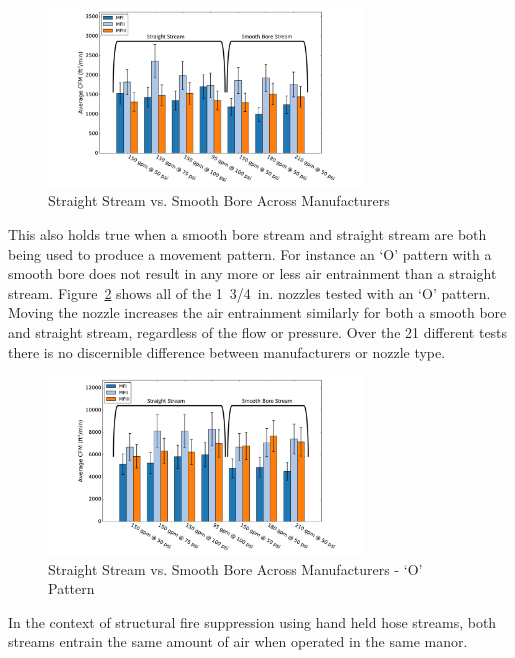 \documentclass[12pt,oneside]{book}
\begin{document}
\begin{figure}[H]
\centering
\includegraphics[width=0.75\textwidth]{Figures/Air_Entrainment/SB_SS_All_Manufacture.pdf}
\caption{Straight Stream vs. Smooth Bore Across Manufacturers}
\label{fig:SS_vs_SB}
\end{figure}

This also holds true when a smooth bore stream and straight stream are both being used to produce a movement pattern. For instance an `O' pattern with a smooth bore does not result in any more or less air entrainment than a straight stream. Figure~\ref{fig:SS_vs_SB_O} shows all of the 1~3/4~in. nozzles tested with an `O' pattern. Moving the nozzle increases the air entrainment similarly for both a smooth bore and straight stream, regardless of the flow or pressure. Over the 21 different tests there is no discernible difference between manufacturers or nozzle type. 

\begin{figure}[H]
\centering
\includegraphics[width=0.75\textwidth]{Figures/Air_Entrainment/SB_SS_All_O_Manufacture.pdf}
\caption{Straight Stream vs. Smooth Bore Across Manufacturers - `O' Pattern}
\label{fig:SS_vs_SB_O}
\end{figure}

In the context of structural fire suppression using hand held hose streams, both streams entrain the same amount of air when operated in the same manor. 
\end{document}
